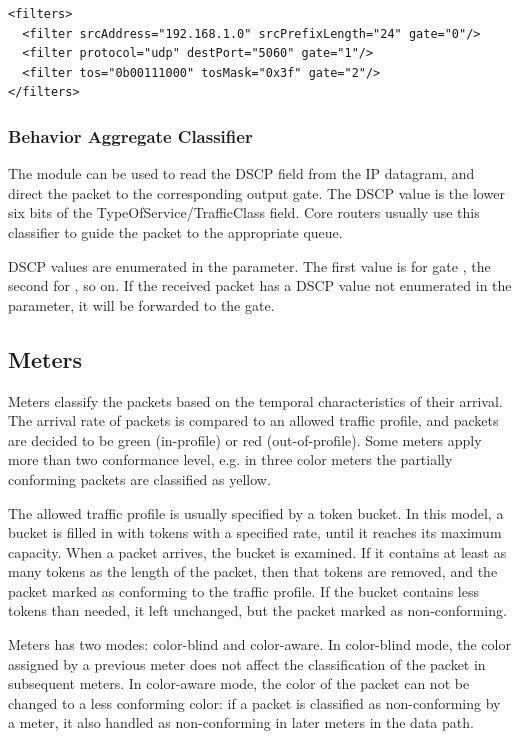\begin{verbatim}
<filters>
  <filter srcAddress="192.168.1.0" srcPrefixLength="24" gate="0"/>
  <filter protocol="udp" destPort="5060" gate="1"/>
  <filter tos="0b00111000" tosMask="0x3f" gate="2"/>
</filters>
\end{verbatim}
 
\subsubsection*{Behavior Aggregate Classifier}

The  module can be used to read
the DSCP field from the IP datagram, and direct the packet to
the corresponding output gate. The DSCP value is the lower
six bits of the TypeOfService/TrafficClass field. Core routers
usually use this classifier to guide the packet to the appropriate
queue.

DSCP values are enumerated in the  parameter.
The first value is for gate , the second for
, so on. If the received packet has a DSCP
value not enumerated in the  parameter, it will
be forwarded to the  gate.

\subsection{Meters}

Meters classify the packets based on the temporal characteristics
of their arrival. The arrival rate of packets is compared to an
allowed traffic profile, and packets are decided to be green
(in-profile) or red (out-of-profile). Some meters apply more than two
conformance level, e.g. in three color meters the partially conforming
packets are classified as yellow.

The allowed traffic profile is usually specified by a token bucket.
In this model, a bucket is filled in with tokens with a specified rate,
until it reaches its maximum capacity. When a packet arrives, the
bucket is examined. If it contains at least as many tokens as the
length of the packet, then that tokens are removed, and the packet
marked as conforming to the traffic profile. If the bucket contains
less tokens than needed, it left unchanged, but the packet marked
as non-conforming.

Meters has two modes: color-blind and color-aware.
In color-blind mode, the color assigned by a previous meter does not
affect the classification of the packet in subsequent meters.
In color-aware mode, the color of the packet can not be changed to a less
conforming color: if a packet is classified as non-conforming by a meter,
it also handled as non-conforming in later meters in the data path.

